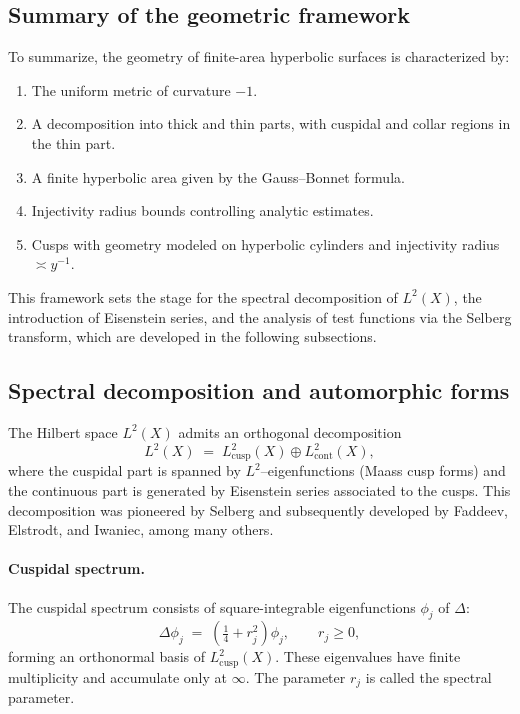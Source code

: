 \subsection{Summary of the geometric framework}\label{subsec:geometry-summary}

To summarize, the geometry of finite-area hyperbolic surfaces is characterized by:
\begin{enumerate}
  \item The uniform metric of curvature $-1$.
  \item A decomposition into thick and thin parts, with cuspidal and collar regions in the thin part.
  \item A finite hyperbolic area given by the Gauss--Bonnet formula.
  \item Injectivity radius bounds controlling analytic estimates.
  \item Cusps with geometry modeled on hyperbolic cylinders and injectivity radius $\asymp y^{-1}$.
\end{enumerate}

This framework sets the stage for the spectral decomposition of $L^2(X)$, the introduction of Eisenstein series, and the analysis of test functions via the Selberg transform, which are developed in the following subsections.

\subsection{Spectral decomposition and automorphic forms}\label{subsec:spectral}

The Hilbert space $L^2(X)$ admits an orthogonal decomposition
\[
L^2(X) \;=\; L^2_{\mathrm{cusp}}(X) \oplus L^2_{\mathrm{cont}}(X),
\]
where the cuspidal part is spanned by $L^2$–eigenfunctions (Maass cusp forms) and the continuous part is generated by Eisenstein series associated to the cusps. This decomposition was pioneered by Selberg \cite{selberg1956} and subsequently developed by Faddeev, Elstrodt, and Iwaniec, among many others.

\paragraph{Cuspidal spectrum.}
The cuspidal spectrum consists of square-integrable eigenfunctions $\phi_j$ of $\Delta$:
\[
\Delta \phi_j \;=\; \left(\tfrac14 + r_j^2\right)\phi_j,\qquad r_j \ge 0,
\]
forming an orthonormal basis of $L^2_{\mathrm{cusp}}(X)$. These eigenvalues have finite multiplicity and accumulate only at $\infty$. The parameter $r_j$ is called the spectral parameter.

